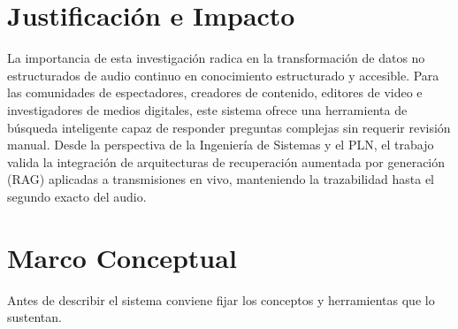 \documentclass[12pt,a4paper]{article}
\begin{document}
\section{Justificación e Impacto}
\label{sec:justificacion}

La importancia de esta investigación radica en la transformación de datos no estructurados de audio continuo en conocimiento estructurado y accesible. Para las comunidades de espectadores, creadores de contenido, editores de video e investigadores de medios digitales, este sistema ofrece una herramienta de búsqueda inteligente capaz de responder preguntas complejas sin requerir revisión manual. Desde la perspectiva de la Ingeniería de Sistemas y el PLN, el trabajo valida la integración de arquitecturas de recuperación aumentada por generación (RAG) aplicadas a transmisiones en vivo, manteniendo la trazabilidad hasta el segundo exacto del audio.

\section{Marco Conceptual}
\label{sec:marco}

Antes de describir el sistema conviene fijar los conceptos y herramientas que lo sustentan.
\end{document}
